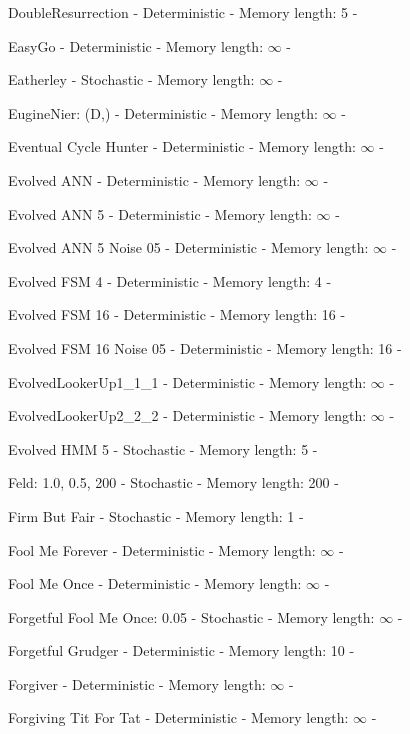 \item DoubleResurrection - Deterministic - Memory length: 5 - \cite{Eckhart2015}
\item EasyGo - Deterministic - Memory length: \(\infty\) - \cite{Li2011, Prison1998}
\item Eatherley - Stochastic - Memory length: \(\infty\) - \cite{Axelrod1980b}
\item EugineNier: (D,) - Deterministic - Memory length: \(\infty\) - \cite{LessWrong2011}
\item Eventual Cycle Hunter - Deterministic - Memory length: \(\infty\) - \cite{Knight2018}
\item Evolved ANN - Deterministic - Memory length: \(\infty\) - \cite{Knight2018}
\item Evolved ANN 5 - Deterministic - Memory length: \(\infty\) - \cite{Knight2018}
\item Evolved ANN 5 Noise 05 - Deterministic - Memory length: \(\infty\) - \cite{Knight2018}
\item Evolved FSM 4 - Deterministic - Memory length: 4 - \cite{Knight2018}
\item Evolved FSM 16 - Deterministic - Memory length: 16 - \cite{Knight2018}
\item Evolved FSM 16 Noise 05 - Deterministic - Memory length: 16 - \cite{Knight2018}
\item EvolvedLookerUp1\_1\_1 - Deterministic - Memory length: \(\infty\) - \cite{Knight2018}
\item EvolvedLookerUp2\_2\_2 - Deterministic - Memory length: \(\infty\) - \cite{Knight2018}
\item Evolved HMM 5 - Stochastic - Memory length: 5 - \cite{Knight2018}
\item Feld: 1.0, 0.5, 200 - Stochastic - Memory length: 200 - \cite{Axelrod1980}
\item Firm But Fair - Stochastic - Memory length: 1 - \cite{Frean1994}
\item Fool Me Forever - Deterministic - Memory length: \(\infty\) - \cite{Knight2018}
\item Fool Me Once - Deterministic - Memory length: \(\infty\) - \cite{Knight2018}
\item Forgetful Fool Me Once: 0.05 - Stochastic - Memory length: \(\infty\) - \cite{Knight2018}
\item Forgetful Grudger - Deterministic - Memory length: 10 - \cite{Knight2018}
\item Forgiver - Deterministic - Memory length: \(\infty\) - \cite{Knight2018}
\item Forgiving Tit For Tat - Deterministic - Memory length: \(\infty\) - \cite{Knight2018}
